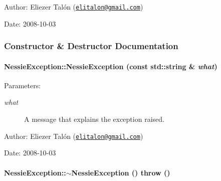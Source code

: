 \begin{Desc}
\item[Author:]Eliezer Talón (\href{mailto:elitalon@gmail.com}{\tt elitalon@gmail.com}) \end{Desc}
\begin{Desc}
\item[Date:]2008-10-03 \end{Desc}


\subsubsection{Constructor \& Destructor Documentation}
\hypertarget{class_nessie_exception_80c86c892438045635bf6a99da17e859}{
\paragraph[{NessieException}]{\setlength{\rightskip}{0pt plus 5cm}NessieException::NessieException (const std::string \& {\em what})}\hfill}
\label{class_nessie_exception_80c86c892438045635bf6a99da17e859}


\begin{Desc}
\item[Parameters:]
\begin{description}
\item[{\em what}]A message that explains the exception raised.\end{description}
\end{Desc}
\begin{Desc}
\item[Author:]Eliezer Talón (\href{mailto:elitalon@gmail.com}{\tt elitalon@gmail.com}) \end{Desc}
\begin{Desc}
\item[Date:]2008-10-03 \end{Desc}
\hypertarget{class_nessie_exception_19f44d2725dd53e2f10505a88e5773f2}{
\paragraph[{$\sim$NessieException}]{\setlength{\rightskip}{0pt plus 5cm}NessieException::$\sim$NessieException ()  throw ()}\hfill}
\label{class_nessie_exception_19f44d2725dd53e2f10505a88e5773f2}


